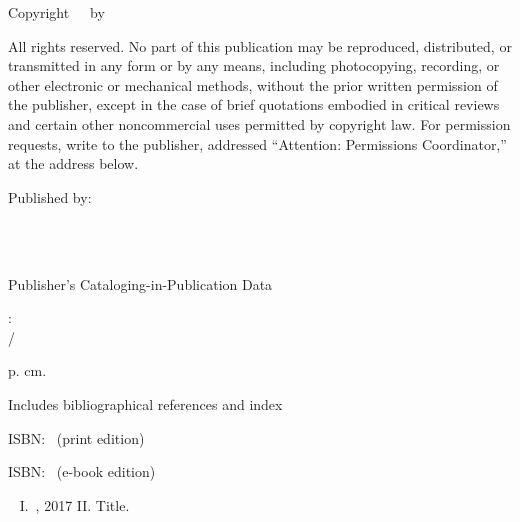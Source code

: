 \bigskip

Copyright\ \textcopyright\ \TheCopyrightYear\ by \TheAuthor

\bigskip

All rights reserved. No part of this publication may be reproduced, distributed, or transmitted in any form or by any means, including photocopying, recording, or other electronic or mechanical methods, without the prior written permission of the publisher, except in the case of brief quotations embodied in critical reviews and certain other noncommercial uses permitted by copyright law. For permission requests, write to the publisher, addressed ``Attention: Permissions Coordinator,'' at the address below.

\bigskip
Published by:
  \begin{adjustwidth}{1cm}{1cm}
		\ThePublisher\\
		\ThePublisherAddrA\\
		\ThePublisherAddrB
  \end{adjustwidth}

%

\bigskip
Publisher's Cataloging-in-Publication Data

\bigskip
\TheAuthorLNF

\TheMainTitle: \\ \hspace*{10mm}\TheSubTitle / \TheAuthorLNF

p. cm.

Includes bibliographical references and index

ISBN: \PrintISBN\, (print edition) 

ISBN: \EbookISBN\, (e-book edition)

\TheCIPSubjectHeadings\par\
I. \TheAuthorLNF\,, 2017 II. Title.

\TheLCCN\par
\TheDDSN\hspace*{3cm}
\TheLCPCN\par
\bigskip

